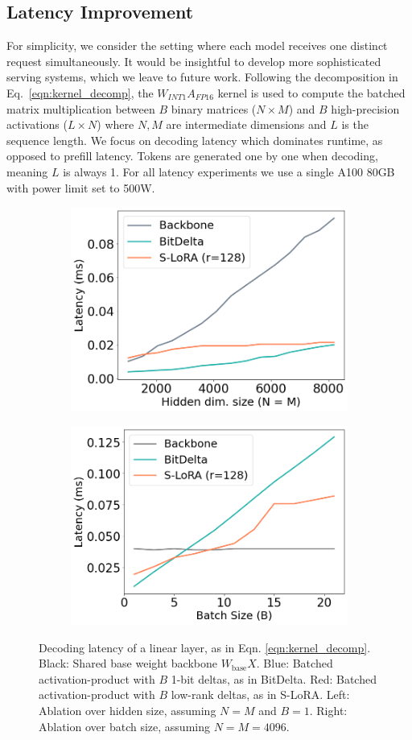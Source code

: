\documentclass[numbers]{article}
\newcommand{\oursmethod}{BitDelta\xspace}
\begin{document}
\subsection{Latency Improvement}
\label{sec:kernel}

For simplicity, we consider the setting where each model receives one distinct request simultaneously. It would be insightful to develop more sophisticated serving systems, which we leave to future work. Following the decomposition in Eq.~\eqref{eqn:kernel_decomp}, the $W_{INT1}A_{FP16}$ kernel is used to compute the batched matrix multiplication between $B$ binary matrices ($N\times M$) and $B$ high-precision activations ($L\times N$) where $N, M$ are intermediate dimensions and $L$ is the sequence length. We focus on decoding latency which dominates runtime, as opposed to prefill latency. Tokens are generated one by one when decoding, meaning $L$ is always 1. For all latency experiments we use a single A100 80GB with power limit set to 500W. 

\begin{figure}
    \centering
    \begin{subfigure}
        \centering
        \includegraphics[width=0.45\linewidth]{kernel1.png}
    \end{subfigure}%
    \hspace{10mm}
    \begin{subfigure}
        \centering
        \includegraphics[width=0.45\linewidth]{kernel2.png}
    \end{subfigure}
    
    \caption{Decoding latency of a linear layer, as in Eqn. \ref{eqn:kernel_decomp}. Black: Shared base weight backbone $W_\text{base}X$. Blue: Batched activation-product with $B$ 1-bit deltas, as in \oursmethod. Red: Batched activation-product with $B$ low-rank deltas, as in S-LoRA. Left: Ablation over hidden size, assuming $N=M$ and $B=1$. Right: Ablation over batch size, assuming $N=M=4096$.}
    \label{fig:kernelstuff}
\end{figure}
\end{document}
